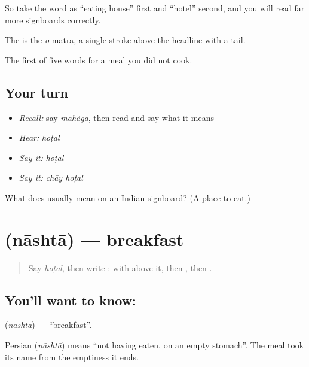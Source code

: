 So take the word as \textquotedblleft{}eating house\textquotedblright{} first and \textquotedblleft{}hotel\textquotedblright{} second, and you will read far more signboards correctly.

The  is the \emph{o} matra, a single stroke above the headline with a tail.

\begin{grammarlens}[title={What you've built}]
The first of five words for a meal you did not cook.
\end{grammarlens}

\subsection*{Your turn}
\begin{itemize}
\raggedright
  \item \emph{Recall:} say \emph{mahãgā}, then read \textbf{} and say what it means
  \item \emph{Hear:} \emph{hoṭal}
  \item \emph{Say it:} \emph{hoṭal}
  \item \emph{Say it:} \emph{chāy hoṭal}
\end{itemize}

\begin{tcolorbox}[breakable,colback=teal!4,colframe=teal!35!black,title={Before you move on}]
What does  usually mean on an Indian signboard? (A place to eat.)
\end{tcolorbox}
\section[nāshtā]{ (nāshtā) — breakfast}

\label{lesson:HI-C73-breakfast}



\begin{quote}
Say \emph{hoṭal}, then write \textbf{}:  with  above it, then , then .
\end{quote}

\subsection*{You'll want to know: }
\textbf{} (\emph{nāshtā}) — \textquotedblleft{}breakfast\textquotedblright{}.

Persian  (\emph{nāshtā}) means \textquotedblleft{}not having eaten, on an empty stomach\textquotedblright{}. The meal took its name from the emptiness it ends.

